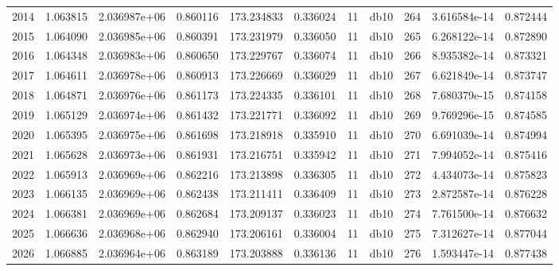 \begin{tabular}{lrrrrrrlrrr}
2014 &    1.063815 &        2.036987e+06 &  0.860116 &              173.234833 &    0.336024 &      11 &         db10 &    264 &   3.616584e-14 &      0.872444 \\
2015 &    1.064090 &        2.036985e+06 &  0.860391 &              173.231979 &    0.336050 &      11 &         db10 &    265 &   6.268122e-14 &      0.872890 \\
2016 &    1.064348 &        2.036983e+06 &  0.860650 &              173.229767 &    0.336074 &      11 &         db10 &    266 &   8.935382e-14 &      0.873321 \\
2017 &    1.064611 &        2.036978e+06 &  0.860913 &              173.226669 &    0.336029 &      11 &         db10 &    267 &   6.621849e-14 &      0.873747 \\
2018 &    1.064871 &        2.036976e+06 &  0.861173 &              173.224335 &    0.336101 &      11 &         db10 &    268 &   7.680379e-15 &      0.874158 \\
2019 &    1.065129 &        2.036974e+06 &  0.861432 &              173.221771 &    0.336092 &      11 &         db10 &    269 &   9.769296e-15 &      0.874585 \\
2020 &    1.065395 &        2.036975e+06 &  0.861698 &              173.218918 &    0.335910 &      11 &         db10 &    270 &   6.691039e-14 &      0.874994 \\
2021 &    1.065628 &        2.036973e+06 &  0.861931 &              173.216751 &    0.335942 &      11 &         db10 &    271 &   7.994052e-14 &      0.875416 \\
2022 &    1.065913 &        2.036969e+06 &  0.862216 &              173.213898 &    0.336305 &      11 &         db10 &    272 &   4.434073e-14 &      0.875823 \\
2023 &    1.066135 &        2.036969e+06 &  0.862438 &              173.211411 &    0.336409 &      11 &         db10 &    273 &   2.872587e-14 &      0.876228 \\
2024 &    1.066381 &        2.036969e+06 &  0.862684 &              173.209137 &    0.336023 &      11 &         db10 &    274 &   7.761500e-14 &      0.876632 \\
2025 &    1.066636 &        2.036968e+06 &  0.862940 &              173.206161 &    0.336004 &      11 &         db10 &    275 &   7.312627e-14 &      0.877044 \\
2026 &    1.066885 &        2.036964e+06 &  0.863189 &              173.203888 &    0.336136 &      11 &         db10 &    276 &   1.593447e-14 &      0.877438 \\

\end{tabular}
